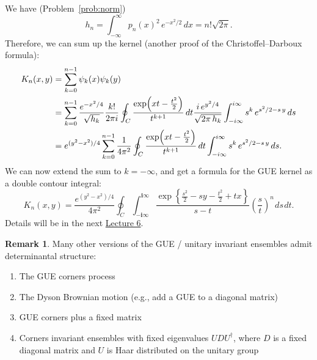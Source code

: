 \documentclass[letterpaper,11pt,oneside,reqno]{article}
\numberwithin{equation}{section}
\newcommand{\ssp}{\hspace{1pt}}
\theoremstyle{definition}
\newtheorem{remark}[proposition]{Remark}
\begin{document}
We have (Problem~\ref{prob:norm})
\begin{equation*}
	h_n=\int_{-\infty}^{\infty} p_n(x)^2\,e^{-x^2/2}\,dx=n!\sqrt{2\pi}.
\end{equation*}
Therefore, we can sum up the kernel (another proof of the Christoffel--Darboux formula):
\begin{align*}
	K_n(x,y)&=
	\sum_{k=0}^{n-1}\psi_k(x)\psi_k(y)
	\\&=
	\sum_{k=0}^{n-1}
	\frac{e^{-x^2/4}}{\sqrt{h_k}}\frac{k!}{2\pi i}\oint_C\frac{\exp\Bigl(xt-\frac{t^2}{2}\Bigr)}{t^{k+1}}\,dt
	\frac{i\,e^{y^2/4}}{\sqrt{2\pi\,h_k}}
	\int_{-i\infty}^{i\infty}s^k\,e^{s^2/2-s\,y}\,ds
	\\&=
	e^{(y^2-x^2)/4}
	\sum_{k=0}^{n-1}
	\frac{1}{4\pi^2}\oint_C\frac{\exp\Bigl(xt-\frac{t^2}{2}\Bigr)}{t^{k+1}}\,dt
	\int_{-i\infty}^{i\infty}s^k\,e^{s^2/2-s\,y}\,ds.
\end{align*}
We can now extend the sum to
$k=-\infty$, and get a formula for the
GUE kernel as a double contour integral:
\begin{equation*}
	K_n(x,y)=\frac{e^{(y^2-x^2)/4}}{4\pi^2}
	\oint_C
	\int_{-\mathbf{i}\infty}^{\mathbf{i}\infty}
	\frac{\exp\left\{ \frac{s^2}{2}-sy-\frac{t^2}{2}+tx \right\}}{s-t}\left( \frac{s}{t} \right)^n\ssp ds\ssp dt.
\end{equation*}
Details will be in the next
\href{https://lpetrov.cc/rmt25/rmt25-notes/rmt2025-l06.pdf}{Lecture 6}.

\begin{remark}
Many other versions of the GUE / unitary invariant ensembles admit determinantal structure:
\begin{enumerate}
	\item The GUE corners process \cite{johansson2006eigenvalues}
    \item The Dyson Brownian motion (e.g., add a GUE to a diagonal matrix)
			\cite{nagao1998multilevel}
		\item GUE corners plus a fixed matrix \cite{Ferrari2014PerturbedGUE}
    \item Corners invariant ensembles with fixed eigenvalues $UDU^\dagger$, where $D$ is a fixed diagonal matrix and $U$ is Haar distributed
			on the unitary group \cite{Metcalfe2011GT}
	\end{enumerate}
\end{remark}


\end{document}
